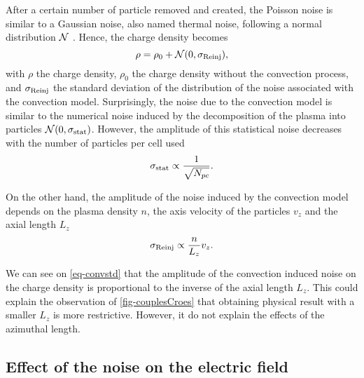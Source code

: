    After a certain number of particle removed and created, the Poisson noise is similar to a Gaussian noise, also named thermal noise, following a normal distribution $\mathcal{N}$ .
    Hence, the charge density becomes
    \begin{equation} \label{eq-rhonoise}
      \rho = \rho_0 + \mathcal{N}(0, \sigma_{\rm Reinj}),
    \end{equation}
    with $\rho$ the charge density, $\rho_0$ the charge density without the convection process, and $\sigma_{\rm Reinj}$ the standard deviation of the distribution of the noise associated with the convection model.
    Surprisingly, the noise due to the convection model is similar to the numerical noise induced by the decomposition of the plasma into particles $\mathcal{N}(0, \sigma_{\rm stat})$.
    However, the amplitude of this statistical noise decreases with the number of particles per cell used
    \begin{equation*} \label{eq-statistical}
     \sigma_{\rm stat} \propto \frac{1}{\sqrt{N_{pc}}}.
    \end{equation*}

    On the other hand, the amplitude of the noise induced by the convection model depends on the plasma density $n$, the axis velocity of the particles $v_z$ and the axial length $L_z$
    \begin{equation} \label{eq-convstd}
     \sigma_{\rm Reinj} \propto \frac{n}{L_z} v_z.
    \end{equation}

    We can see on \cref{eq-convstd} that the amplitude of the convection induced noise on the charge density is proportional to the inverse of the axial length $L_z$.
    This could explain the observation of \cref{fig-couplesCroes} that obtaining physical result with a smaller $L_z$ is more restrictive.
    However, it do not explain the effects of the azimuthal length.

  \subsection{Effect of the noise on the electric field}
